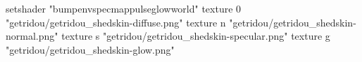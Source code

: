 setshader "bumpenvspecmappulseglowworld"
texture 0 "getridou/getridou_shedskin-diffuse.png"
texture n "getridou/getridou_shedskin-normal.png"
texture s "getridou/getridou_shedskin-specular.png"
texture g "getridou/getridou_shedskin-glow.png"